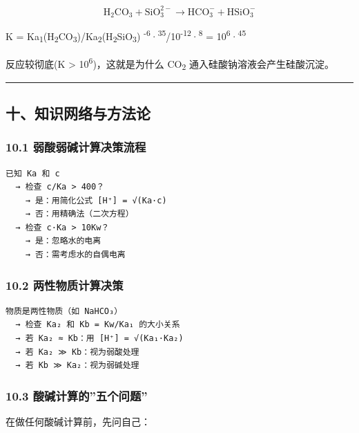 \[
\mathrm{H_2CO_3 + SiO_3^{2-} \to HCO_3^- + HSiO_3^-}
\]

K = Ka\textsubscript{1}(H\textsubscript{2}CO\textsubscript{3})/Ka\textsubscript{2}(H\textsubscript{2}SiO\textsubscript{3}) \textsuperscript{-6}·\textsuperscript{35}/10\textsuperscript{-12}·\textsuperscript{8} = 10\textsuperscript{6}·\textsuperscript{45}

反应较彻底(K \textgreater{} 10\textsuperscript{6})，这就是为什么 CO\textsubscript{2} 通入硅酸钠溶液会产生硅酸沉淀。

\begin{center}\rule{0.5\linewidth}{0.5pt}\end{center}

\subsection{十、知识网络与方法论}\label{ux5341ux77e5ux8bc6ux7f51ux7edcux4e0eux65b9ux6cd5ux8bba}

\subsubsection{10.1 弱酸弱碱计算决策流程}\label{ux5f31ux9178ux5f31ux78b1ux8ba1ux7b97ux51b3ux7b56ux6d41ux7a0b}

\begin{verbatim}
已知 Ka 和 c
  → 检查 c/Ka > 400？
    → 是：用简化公式 [H⁺] = √(Ka·c)
    → 否：用精确法（二次方程）
  → 检查 c·Ka > 10Kw？
    → 是：忽略水的电离
    → 否：需考虑水的自偶电离
\end{verbatim}

\subsubsection{10.2 两性物质计算决策}\label{ux4e24ux6027ux7269ux8d28ux8ba1ux7b97ux51b3ux7b56}

\begin{verbatim}
物质是两性物质（如 NaHCO₃）
  → 检查 Ka₂ 和 Kb = Kw/Ka₁ 的大小关系
  → 若 Ka₂ ≈ Kb：用 [H⁺] = √(Ka₁·Ka₂)
  → 若 Ka₂ ≫ Kb：视为弱酸处理
  → 若 Kb ≫ Ka₂：视为弱碱处理
\end{verbatim}

\subsubsection{10.3 酸碱计算的''五个问题''}\label{ux9178ux78b1ux8ba1ux7b97ux7684ux4e94ux4e2aux95eeux9898}

在做任何酸碱计算前，先问自己：


